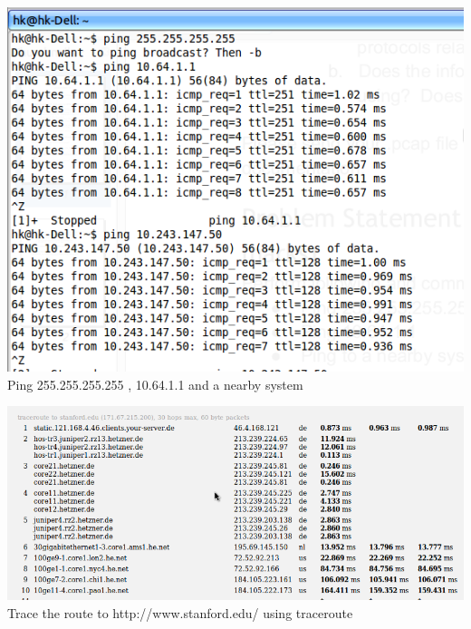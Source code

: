 \documentclass[a4paper,12pt]{report}
\begin{document}
\begin{center}


 \includegraphics[width=13 cm,height=12 cm]{./Screenshot-3.png}
Ping 255.255.255.255 , 10.64.1.1 and  a nearby system 
\end{center}
\begin{center}


 \includegraphics[width=13 cm,height=12 cm]{./Screenshot-4.png}
Trace the route to http://www.stanford.edu/  using traceroute
\end{center}
\end{document}
